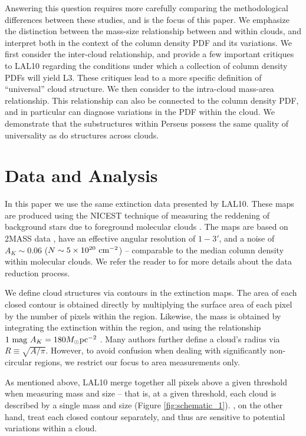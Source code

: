 Answering this question requires more carefully comparing the methodological differences between these studies, and is the focus of this paper. We emphasize the distinction between the mass-size relationship between and within clouds, and interpret both in the context of the column density PDF and its variations. We first consider the inter-cloud relationship, and provide a few important critiques to LAL10 regarding the conditions under which a collection of column density PDFs will yield L3. These critiques lead to a more specific definition of ``universal'' cloud structure. We then consider to the intra-cloud mass-area relationship. This relationship can also be connected to the column density PDF, and in particular can diagnose variations in the PDF within the cloud. We demonstrate that the substructures within Perseus possess the same quality of universality as do structures across clouds.


\section{Data and Analysis}
In this paper we use the same extinction data presented by LAL10. These maps are produced using the NICEST technique of measuring the reddening of background stars due to foreground molecular clouds \citep{nicest}.  The maps are based on 2MASS data \citep{2mass}, have an effective angular resolution of $1-3'$, and a noise of $A_K \sim 0.06$ ($N \sim 5 \times 10^{20} \rm ~ cm^{-2}$) -- comparable to the median column density within molecular clouds. We refer the reader to \cite{Lombardi10} for more details about the data reduction process.

We define cloud structures via contours in the extinction maps. The area of each closed contour is obtained directly by multiplying the surface area of each pixel by the number of pixels within the region. Likewise, the mass is obtained by integrating the extinction within the region, and using the relationship ${\rm 1~ mag~ }A_K = 180 M_\odot \rm pc^{-2}$ \citep{Rieke85}. Many authors further define a cloud's radius via $R \equiv \sqrt{A / \pi}$. However, to avoid confusion when dealing with significantly non-circular regions, we restrict our focus to area measurements only.

As mentioned above, LAL10 merge together all pixels above a given threshold when measuring mass and size -- that is, at a given threshold, each cloud is described by a single mass and size (Figure \ref{fig:schematic_1}). \cite{Kauffmann10a}, on the other hand, treat each closed contour separately, and thus are sensitive to potential variations within a cloud.

